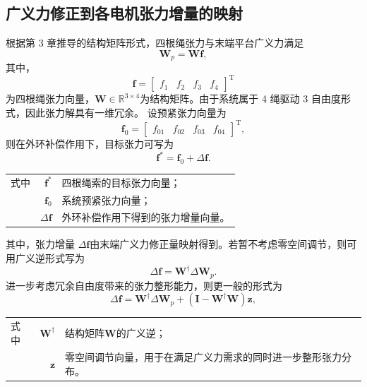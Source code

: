 \subsection{广义力修正到各电机张力增量的映射}

根据第 3 章推导的结构矩阵形式，四根绳张力与末端平台广义力满足
\begin{equation}
  \bm W_p=\bm W \bm f, \label{eq:ch4-wf}
\end{equation}
其中，
\begin{equation}
  \bm f= \begin{bmatrix} f_1 & f_2 & f_3 & f_4 \end{bmatrix}^{\mathrm T}
\end{equation}
为四根绳张力向量，$\bm W\in\mathbb R^{3\times 4}$为结构矩阵。由于系统属于 4 绳驱动 3 自由度形式，因此张力解具有一维冗余。
设预紧张力向量为
\begin{equation}
  \bm f_0= \begin{bmatrix} f_{01} & f_{02} & f_{03} & f_{04} \end{bmatrix}^{\mathrm T},
\end{equation}
则在外环补偿作用下，目标张力可写为
\begin{equation}
  \bm f^\ast = \bm f_0+\Delta \bm f. \label{eq:ch4-fstar}
\end{equation}
\begin{tabularx}{\textwidth}{@{}l@{\quad}r@{———}X@{}}
  式中 & $\bm f^\ast$ & 四根绳索的目标张力向量；\\
       & $\bm f_0$ & 系统预紧张力向量；\\
       & $\Delta \bm f$ & 外环补偿作用下得到的张力增量向量。
\end{tabularx}

其中，张力增量 $\Delta \bm f$由末端广义力修正量映射得到。若暂不考虑零空间调节，则可用广义逆形式写为
\begin{equation}
  \Delta \bm f = \bm W^\dagger \Delta \bm W_p. \label{eq:ch4-deltaf-basic}
\end{equation}
进一步考虑冗余自由度带来的张力整形能力，则更一般的形式为
\begin{equation}
  \Delta \bm f = \bm W^\dagger \Delta \bm W_p + \left( \bm I-\bm W^\dagger\bm W \right)\bm z, \label{eq:ch4-deltaf-null}
\end{equation}
\begin{tabularx}{\textwidth}{@{}l@{\quad}r@{———}X@{}}
  式中 & $\bm W^\dagger$ & 结构矩阵$\bm W$的广义逆；\\
       & $\bm z$ & 零空间调节向量，用于在满足广义力需求的同时进一步整形张力分布。
\end{tabularx}

